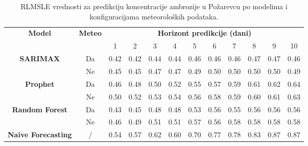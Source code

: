 \documentclass[12pt]{article}
\begin{document}
\begin{table}[h!]
\centering
\caption{RLMSLE vrednosti za predikciju koncentracije ambrozije u Požarevcu po modelima i konfiguracijama meteoroloških podataka.}
\label{tab:rlmsle_ambrozija}

\begin{tabular}{|c|c|*{10}{c|}}
\hline
\multirow{2}{*}{\textbf{Model}} & \multirow{2}{*}{\textbf{Meteo}} 
& \multicolumn{10}{c|}{\textbf{Horizont predikcije (dani)}} \\ \cline{3-12}
& & 1 & 2 & 3 & 4 & 5 & 6 & 7 & 8 & 9 & 10 \\ \hline
\multirow{2}{*}{\centering \textbf{SARIMAX}} & Da & 0.42 & 0.42 & 0.44 & 0.44 & 0.46 & 0.46 & 0.46 & 0.47 & 0.47 & 0.46 \\ \cline{2-12}
 & Ne & 0.45 & 0.45 & 0.47 & 0.47 & 0.49 & 0.50 & 0.50 & 0.50 & 0.50 & 0.49 \\ \hline
\multirow{2}{*}{\centering \textbf{Prophet}} & Da & 0.46 & 0.48 & 0.50 & 0.52 & 0.55 & 0.57 & 0.59 & 0.61 & 0.62 & 0.64 \\ \cline{2-12}
 & Ne & 0.50 & 0.52 & 0.53 & 0.54 & 0.56 & 0.58 & 0.59 & 0.60 & 0.61 & 0.63 \\ \hline
\multirow{2}{*}{\centering \textbf{Random Forest}} & Da & 0.43 & 0.45 & 0.48 & 0.48 & 0.53 & 0.56 & 0.55 & 0.56 & 0.56 & 0.56 \\ \cline{2-12}
 & Ne & 0.46 & 0.49 & 0.51 & 0.51 & 0.57 & 0.56 & 0.58 & 0.58 & 0.58  & 0.58 \\ \hline
\multirow{1}{*}{\centering \textbf{Naive Forecasting}} & / & 0.54 & 0.57 & 0.62 & 0.60 & 0.70 & 0.77 & 0.78 & 0.83 & 0.87 &  0.87 \\ \hline
\end{tabular}%

\end{table}
\newpage
\end{document}
